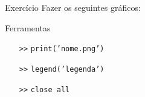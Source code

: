 \documentclass[hyperref={pdfpagelabels=false}]{beamer}
\begin{document}
\begin{frame}{Exercício}
  Fazer os seguintes gráficos:
  \begin{center}
  \end{center}
  \vfill
  \begin{center}
  \end{center}
\end{frame}

\begin{frame}{Ferramentas}
  \begin{itemize}
  \item[{\texttt{>>}}] {\texttt{print('nome.png')}}
  \item[{\texttt{>>}}] {\texttt{legend('legenda')}}
  \item[{\texttt{>>}}] {\texttt{close all}}
  \end{itemize}
\end{frame}
\end{document}
